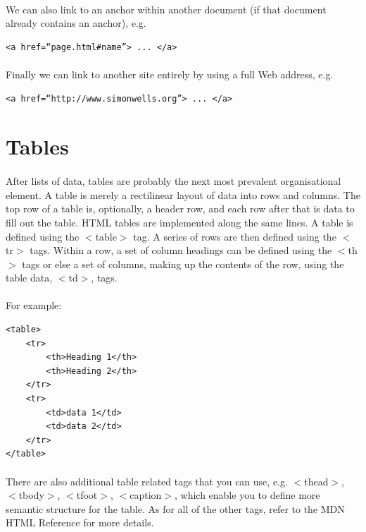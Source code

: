\paragraph{} We can also link to an anchor within another document (if that document already contains an anchor), e.g.
\begin{lstlisting}
<a href=“page.html#name”> ... </a>
\end{lstlisting}
\paragraph{} Finally we can link to another site entirely by using a full Web address, e.g.
\begin{lstlisting}
<a href=“http://www.simonwells.org”> ... </a> 
\end{lstlisting}

\section{Tables}
\paragraph{} After lists of data, tables are probably the next most prevalent organisational element. A table is merely a rectilinear layout of data into rows and columns. The top row of a table is, optionally, a header row, and each row after that is data to fill out the table. HTML tables are implemented along the same lines. A table is defined using the $<$table$>$ tag. A series of rows are then defined using the $<$tr$>$ tags. Within a row, a set of column headings can be defined using the $<$th$>$ tags or else a set of columns, making up the contents of the row,  using the table data, $<$td$>$, tags.
\paragraph{} For example:
\begin{lstlisting}
<table>
	<tr>
		<th>Heading 1</th>
		<th>Heading 2</th>
	</tr>
	<tr>
		<td>data 1</td>
		<td>data 2</td>
	</tr>
</table>
\end{lstlisting}
\paragraph{} There are also additional table related tags that you can use, e.g. $<$thead$>$, $<$tbody$>$, $<$tfoot$>$, $<$caption$>$, which enable you to define more semantic structure for the table. As for all of the other tags, refer to the MDN HTML Reference for more details.

